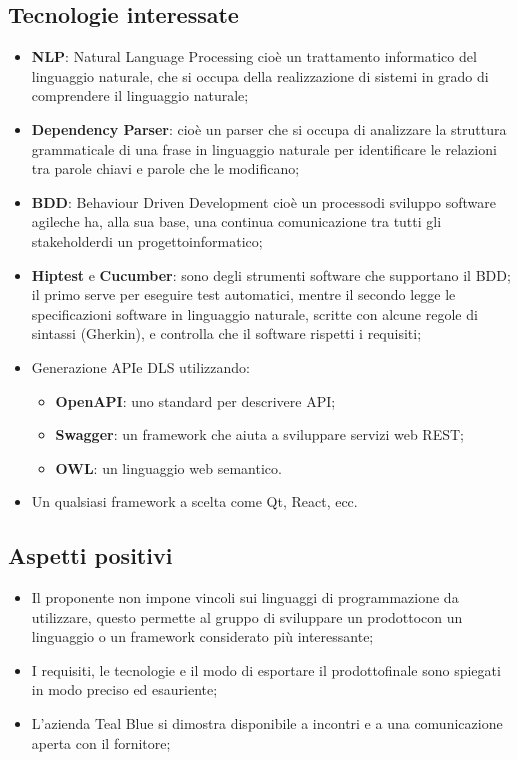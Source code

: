 \subsection{Tecnologie interessate}
\begin{itemize}
	\item \textbf{NLP}: Natural Language Processing cioè un trattamento informatico del linguaggio naturale, che si occupa della realizzazione di sistemi in grado di comprendere il linguaggio naturale;	
	\item \textbf{Dependency Parser}: cioè un parser che si occupa di analizzare la struttura grammaticale di una frase in linguaggio naturale per identificare le relazioni tra parole chiavi e parole che le modificano;
	\item \textbf{BDD}: Behaviour Driven Development cioè un processo\glosp di sviluppo software agile\glosp che ha, alla sua base, una continua comunicazione tra tutti gli stakeholder\glosp di un progetto\glosp informatico;
	\item \textbf{Hiptest} e \textbf{Cucumber}: sono degli strumenti software che supportano il BDD; il primo serve per eseguire test automatici, mentre il secondo legge le specificazioni software in linguaggio naturale, scritte con alcune regole di sintassi (Gherkin), e controlla che il software rispetti i requisiti;
	\item Generazione API\glosp e DLS utilizzando:
	\begin{itemize}
		\item \textbf{OpenAPI}: uno standard per descrivere API\glo;
		\item \textbf{Swagger}: un framework che aiuta a sviluppare servizi web REST\glo;
		\item \textbf{OWL}: un linguaggio web semantico.
	\end{itemize}
	\item Un qualsiasi framework a scelta come Qt, React, ecc.
\end{itemize} 
\subsection{Aspetti positivi}
\begin{itemize} 
	\item Il proponente non impone vincoli sui linguaggi di programmazione da utilizzare, questo permette al gruppo di sviluppare un prodotto\glosp con un linguaggio o un framework considerato più interessante;
	\item I requisiti, le tecnologie e il modo di esportare il prodotto\glosp finale sono spiegati in modo preciso ed esauriente;
	\item L'azienda Teal Blue si dimostra disponibile a incontri e a una comunicazione aperta con il fornitore;
\end{itemize}
